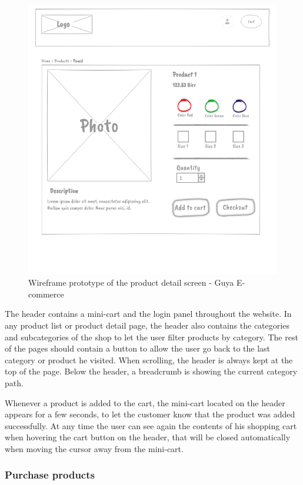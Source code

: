 \begin{figure}[!h]
\center
\includegraphics[keepaspectratio, width=15cm]{wireframes/product-detail.png}
\caption{Wireframe prototype of the product detail screen - Guya E-commerce}
\label{product-detail}
\end{figure}
\clearpage

The header contains a mini-cart and the login panel throughout the website. In any product list or product detail page, the header also contains the categories and subcategories of the shop to let the user filter products by category. The rest of the pages should contain a button to allow the user go back to the last category or product he visited. When scrolling, the header is always kept at the top of the page. Below the header, a breadcrumb is showing the current category path.

Whenever a product is added to the cart, the mini-cart located on the header appears for a few seconds, to let the customer know that the product was added successfully. At any time the user can see again the contents of his shopping cart when hovering the cart button on the header, that will be closed automatically when moving the cursor away from the mini-cart.

\subsubsection{Purchase products}

